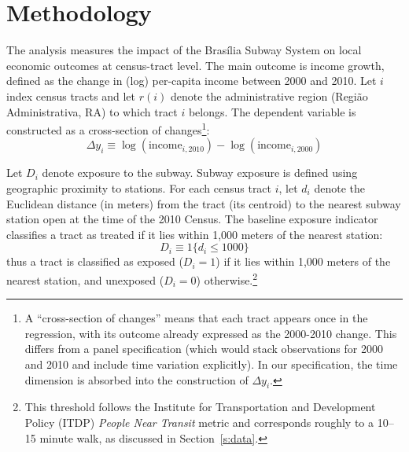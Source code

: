 \section{Methodology}
\label{s:methodology}

The analysis measures the impact of the Brasília Subway System on local economic outcomes at census-tract level. The main outcome is income growth, defined as the change in (log) per-capita income between 2000 and 2010. Let $i$ index census tracts and let $r(i)$ denote the administrative region (Região Administrativa, RA) to which tract $i$ belongs. The dependent variable is constructed as a cross-section of changes\footnote{A ``cross-section of changes'' means that each tract appears once in the regression, with its outcome already expressed as the 2000-2010 change. This differs from a panel specification (which would stack observations for 2000 and 2010 and include time variation explicitly). In our specification, the time dimension is absorbed into the construction of $\Delta y_{i}$.}:
\begin{equation}
    \Delta y_{i} \equiv \log (\text{income}_{i,2010}) - \log (\text{income}_{i,2000})
    \label{eq:incomechange}
\end{equation}

Let $D_{i}$ denote exposure to the subway. Subway exposure is defined using geographic proximity to stations. For each census tract $i$, let $d_{i}$ denote the Euclidean distance (in meters) from the tract (its centroid) to the nearest subway station open at the time of the 2010 Census. The baseline exposure indicator classifies a tract as treated if it lies within 1,000 meters of the nearest station:
\begin{equation}
    D_{i} \equiv 1\{d_{i} \leq 1000\}
    \label{eq:exposure_var}
\end{equation}
thus a tract is classified as exposed ($D_{i} = 1$) if it lies within 1,000 meters of the nearest station, and unexposed ($D_{i} = 0$) otherwise.\footnote{This threshold follows the Institute for Transportation and Development Policy (ITDP) \emph{People Near Transit} metric and corresponds roughly to a 10--15 minute walk, as discussed in Section~\ref{s:data}.} 

